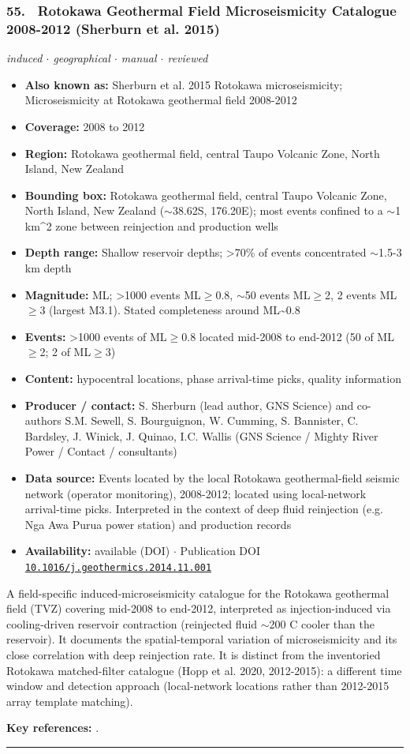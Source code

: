 \documentclass[10pt,a4paper]{article}
\newcommand{\catentryrule}{\par\vspace{3pt}\noindent\textcolor{rulegrey}{\rule{\linewidth}{0.3pt}}\par\vspace{5pt}}
\newcommand{\kv}[2]{\item \textbf{#1:} #2}
\begin{document}
\subsubsection*{\hypertarget{c:55}{55.}~ Rotokawa Geothermal Field Microseismicity Catalogue 2008-2012 (Sherburn et al. 2015)}
{\small\itshape induced $\cdot$ geographical $\cdot$ manual $\cdot$ reviewed}\par\vspace{2pt}
\begin{itemize}[leftmargin=1.3em,itemsep=0.6pt,topsep=1pt,parsep=0pt]
\kv{Also known as}{Sherburn et al. 2015 Rotokawa microseismicity; Microseismicity at Rotokawa geothermal field 2008-2012}
\kv{Coverage}{2008 to 2012}
\kv{Region}{Rotokawa geothermal field, central Taupo Volcanic Zone, North Island, New Zealand}
\kv{Bounding box}{Rotokawa geothermal field, central Taupo Volcanic Zone, North Island, New Zealand ($\sim$38.62S, 176.20E); most events confined to a $\sim$1 km\textasciicircum{}2 zone between reinjection and production wells}
\kv{Depth range}{Shallow reservoir depths; \textgreater{}70\% of events concentrated $\sim$1.5-3 km depth}
\kv{Magnitude}{ML; \textgreater{}1000 events ML$\geq$0.8, $\sim$50 events ML$\geq$2, 2 events ML$\geq$3 (largest M3.1). Stated completeness around ML\textasciitilde{}0.8}
\kv{Events}{\textgreater{}1000 events of ML$\geq$0.8 located mid-2008 to end-2012 (50 of ML$\geq$2; 2 of ML$\geq$3)}
\kv{Content}{hypocentral locations, phase arrival-time picks, quality information}
\kv{Producer / contact}{S. Sherburn (lead author, GNS Science) and co-authors S.M. Sewell, S. Bourguignon, W. Cumming, S. Bannister, C. Bardsley, J. Winick, J. Quinao, I.C. Wallis (GNS Science / Mighty River Power / Contact / consultants)}
\kv{Data source}{Events located by the local Rotokawa geothermal-field seismic network (operator monitoring), 2008-2012; located using local-network arrival-time picks. Interpreted in the context of deep fluid reinjection (e.g. Nga Awa Purua power station) and production records}
\kv{Availability}{available (DOI) $\cdot$ Publication DOI \href{https://doi.org/10.1016/j.geothermics.2014.11.001}{\nolinkurl{10.1016/j.geothermics.2014.11.001}}}
\end{itemize}
\par\vspace{2pt}A field-specific induced-microseismicity catalogue for the Rotokawa geothermal field (TVZ) covering mid-2008 to end-2012, interpreted as injection-induced via cooling-driven reservoir contraction (reinjected fluid $\sim$200 C cooler than the reservoir). It documents the spatial-temporal variation of microseismicity and its close correlation with deep reinjection rate. It is distinct from the inventoried Rotokawa matched-filter catalogue (Hopp et al. 2020, 2012-2015): a different time window and detection approach (local-network locations rather than 2012-2015 array template matching).
\par\vspace{2pt}\textbf{Key references:} \cite{Sherburn2015}.
\catentryrule
\end{document}
